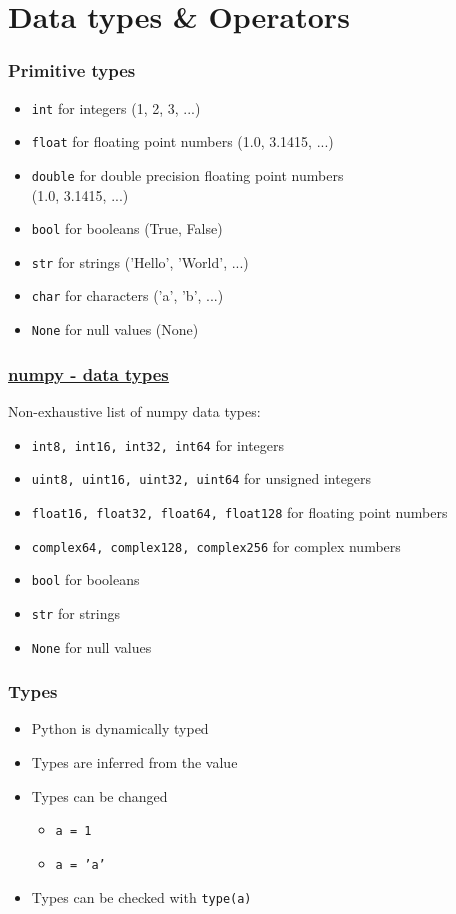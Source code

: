 \documentclass{beamer}
\newcommand{\hrefu}[2]{\underline{\href{#1}{#2}}}
\begin{document}
\section{Data types \& Operators}
\begin{frame}
    \frametitle{Primitive types}
    \begin{itemize}
      \item \texttt{int} for integers (1, 2, 3, ...)
      \item \texttt{float} for floating point numbers (1.0, 3.1415, ...)
      \item \texttt{double} for double precision floating point numbers \\
      (1.0, 3.1415, ...)
      \item \texttt{bool} for booleans (True, False)
      \item \texttt{str} for strings ('Hello', 'World', ...)
      \item \texttt{char} for characters ('a', 'b', ...)
      \item \texttt{None} for null values (None)
    \end{itemize}
\end{frame}
\begin{frame}
  \frametitle{\hrefu{https://numpy.org/doc/stable/user/basics.types.html}{numpy - data types}}
  Non-exhaustive list of numpy data types:
  \begin{itemize}
    \item \texttt{int8, int16, int32, int64} for integers
    \item \texttt{uint8, uint16, uint32, uint64} for unsigned integers
    \item \texttt{float16, float32, float64, float128} for floating point numbers
    \item \texttt{complex64, complex128, complex256} for complex numbers
    \item \texttt{bool} for booleans
    \item \texttt{str} for strings
    \item \texttt{None} for null values
  \end{itemize}
\end{frame}
\begin{frame}
    \frametitle{Types}
  \begin{itemize}
    \item Python is dynamically typed
    \item Types are inferred from the value
    \item Types can be changed
    \begin{itemize}
      \item \texttt{a = 1}
      \item \texttt{a = 'a'}
    \end{itemize}
    \item Types can be checked with \texttt{type(a)}
  \end{itemize}
\end{frame}
\end{document}
